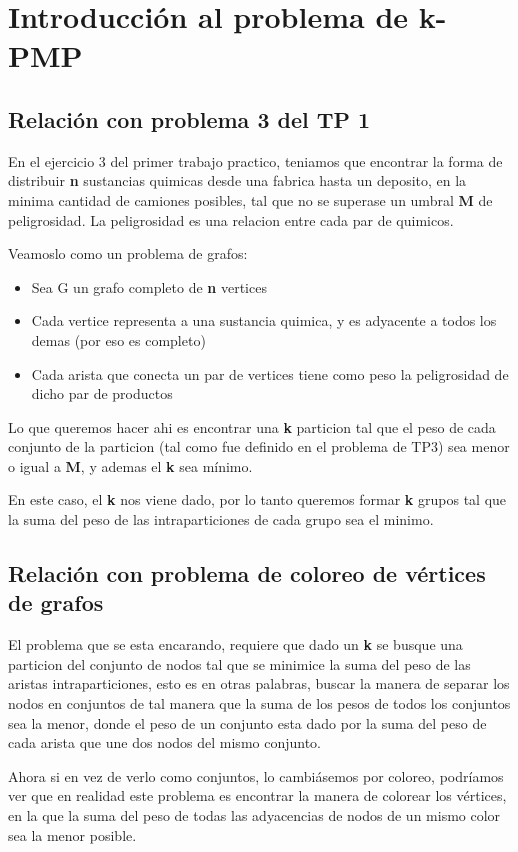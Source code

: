 \section{Introducción al problema de k-PMP}
\subsection{Relación con problema 3 del TP 1}
En el ejercicio 3 del primer trabajo practico, teniamos que encontrar la forma de distribuir \textbf{n} sustancias quimicas desde una fabrica hasta un deposito, en la minima cantidad de camiones posibles, tal que no se superase un umbral \textbf{M} de peligrosidad. La peligrosidad es una relacion entre cada par de quimicos.

Veamoslo como un problema de grafos:

\begin{itemize}
 \item Sea G un grafo completo de \textbf{n} vertices
 \item Cada vertice representa a una sustancia quimica, y es adyacente a todos los demas (por eso es completo)
 \item Cada arista que conecta un par de vertices tiene como peso la peligrosidad de dicho par de productos
\end{itemize}

Lo que queremos hacer ahi es encontrar una \textbf{k} particion tal que el peso de cada conjunto de la particion (tal como fue definido en el problema de TP3) sea menor o igual a \textbf{M}, y ademas el \textbf{k} sea mínimo.

En este caso, el \textbf{k} nos viene dado, por lo tanto queremos formar \textbf{k} grupos tal que la suma del peso de las intraparticiones de cada grupo sea el minimo.

\subsection{Relación con problema de coloreo de vértices de grafos}
El problema que se esta encarando, requiere que dado un \textbf{k} se busque una particion del conjunto de nodos tal que se minimice la suma del peso de las aristas intraparticiones, esto es en otras palabras, buscar la manera de separar los nodos en conjuntos de tal manera que la suma de los pesos de todos los conjuntos sea la menor, donde el peso de un conjunto esta dado por la suma del peso de cada arista que une dos nodos del mismo conjunto.

Ahora si en vez de verlo como conjuntos, lo cambiásemos por coloreo, podríamos ver que en realidad este problema es encontrar la manera de colorear los vértices, en la que la suma del peso de todas las adyacencias de nodos de un mismo color sea la menor posible.

